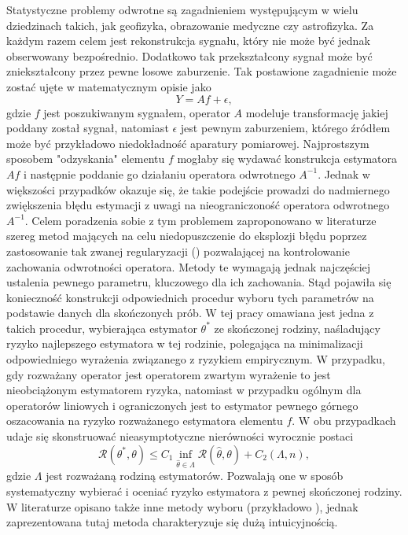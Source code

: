 \documentclass[man,mfiu]{mgrwms}
\begin{document}
\begin{wstep}
Statystyczne problemy odwrotne są zagadnieniem występującym w wielu dziedzinach takich, jak geofizyka, obrazowanie medyczne czy astrofizyka. Za każdym razem celem jest rekonstrukcja sygnału, który nie może być jednak obserwowany bezpośrednio. Dodatkowo tak przekształcony sygnał może być zniekształcony przez pewne losowe zaburzenie. Tak postawione zagadnienie może zostać ujęte w matematycznym opisie jako
\begin{displaymath}
Y=Af+\epsilon,
\end{displaymath}
gdzie $f$ jest poszukiwanym sygnałem, operator $A$ modeluje transformację jakiej poddany został sygnał, natomiast $\epsilon$ jest pewnym zaburzeniem, którego źródłem może być przykładowo niedokładność aparatury pomiarowej. Najprostszym sposobem "odzyskania" elementu $f$ mogłaby się wydawać konstrukcja estymatora $Af$ i następnie poddanie go działaniu operatora odwrotnego $A^{-1}$. Jednak w większości przypadków okazuje się, że takie podejście prowadzi do nadmiernego zwiększenia błędu estymacji z uwagi na nieograniczoność operatora odwrotnego $A^{-1}$. Celem poradzenia sobie z tym problemem zaproponowano w literaturze szereg metod mających na celu niedopuszczenie do eksplozji błędu poprzez zastosowanie tak zwanej regularyzacji (\cite{engl}) pozwalającej na kontrolowanie zachowania odwrotności operatora. Metody te wymagają jednak najczęściej ustalenia pewnego parametru, kluczowego dla ich zachowania. Stąd pojawiła się konieczność konstrukcji odpowiednich procedur wyboru tych parametrów na podstawie danych dla skończonych prób. W tej pracy omawiana jest jedna z takich procedur, wybierająca estymator $\theta^*$ ze skończonej rodziny, naśladujący ryzyko najlepszego estymatora w tej rodzinie, polegająca na minimalizacji odpowiedniego wyrażenia związanego z ryzykiem empirycznym. W przypadku, gdy rozważany operator jest operatorem zwartym wyrażenie to jest nieobciążonym estymatorem ryzyka, natomiast w przypadku ogólnym dla operatorów liniowych i ograniczonych jest to estymator pewnego górnego oszacowania na ryzyko rozważanego estymatora elementu $f$. W obu przypadkach udaje się skonstruować nieasymptotyczne nierówności wyrocznie postaci 
\begin{displaymath}
\mathcal{R}(\theta^*,\theta)\leq C_1 \inf_{\hat{\theta} \in \Lambda}\mathcal{R}(\hat{\theta},\theta)+C_2(\Lambda,n),
\end{displaymath}
gdzie $\Lambda$ jest rozważaną rodziną estymatorów. Pozwalają one w sposób systematyczny wybierać i oceniać ryzyko estymatora z pewnej skończonej rodziny. W literaturze opisano także inne metody wyboru (przykładowo \cite{cavalier3}), jednak zaprezentowana tutaj metoda charakteryzuje się dużą intuicyjnością.\\

\end{wstep}
\end{document}
